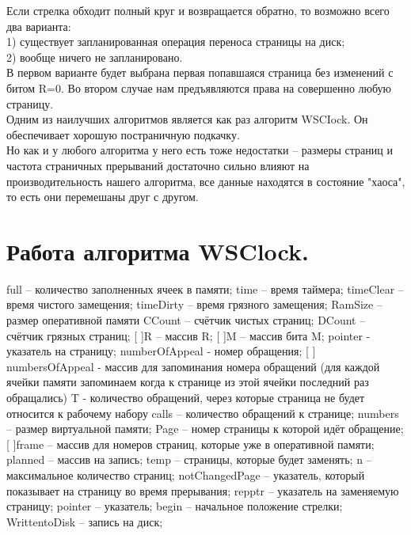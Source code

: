 Если стрелка обходит полный круг и возвращается обратно, то возможно всего два варианта: \\
1) существует запланированная операция переноса страницы на диск; \\
2) вообще ничего не запланировано. \\
В первом варианте будет выбрана первая попавшаяся страница без изменений с битом R=0. Во втором случае нам предъявляются права на совершенно любую страницу. \\
Одним из наилучших алгоритмов является как раз алгоритм WSCIock. Он обеспечивает хорошую постраничную подкачку.\\ 
Но как и у любого алгоритма у него есть тоже недостатки – размеры страниц и частота страничных прерываний достаточно сильно влияют на производительность нашего алгоритма, все данные находятся в состояние "хаоса", то есть они перемешаны друг с другом. 

\section{Работа алгоритма WSClock.}
full – количество заполненных ячеек в памяти;
time – время таймера;
timeClear – время чистого замещения; 
timeDirty – время грязного замещения;
RamSize – размер оперативной памяти
CCount – счётчик чистых страниц; 
DCount – счётчик грязных страниц;
[ ]R – массив R; 
[ ]M – массив бита M;
pointer - указатель на страницу;
numberOfAppeal - номер обращения;
[ ] numbersOfAppeal - массив для запоминания номера обращений (для каждой ячейки памяти запоминаем когда к странице из этой ячейки последний раз обращались)
T - количество обращений, через которые страница не будет относится к рабочему набору
calls – количество обращений к странице;
numbers – размер виртуальной памяти;
Page – номер страницы к которой идёт обращение;
[ ]frame – массив для номеров страниц, которые уже в оперативной памяти;
planned – массив на запись;
temp – страницы, которые будет заменять;
n – максимальное количество страниц;
notChangedPage – указатель, который показывает на страницу во время прерывания;
repptr – указатель на заменяемую страницу;
pointer – указатель;
begin – начальное положение стрелки;
WrittentoDisk – запись на диск;

